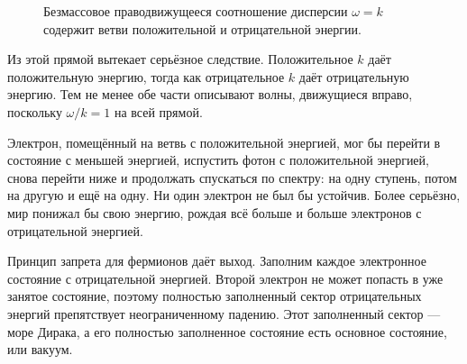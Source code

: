 \begin{figure}[htbp]
\centering
{}
\caption{Безмассовое праводвижущееся соотношение дисперсии \(\omega=k\) содержит ветви положительной и отрицательной энергии.}
\end{figure}

Из этой прямой вытекает серьёзное следствие. Положительное \(k\) даёт положительную энергию, тогда как отрицательное \(k\) даёт отрицательную энергию. Тем не менее обе части описывают волны, движущиеся вправо, поскольку \(\omega/k=1\) на всей прямой.

Электрон, помещённый на ветвь с положительной энергией, мог бы перейти в состояние с меньшей энергией, испустить фотон с положительной энергией, снова перейти ниже и продолжать спускаться по спектру: на одну ступень, потом на другую и ещё на одну. Ни один электрон не был бы устойчив. Более серьёзно, мир понижал бы свою энергию, рождая всё больше и больше электронов с отрицательной энергией.

Принцип запрета для фермионов даёт выход. Заполним каждое электронное состояние с отрицательной энергией. Второй электрон не может попасть в уже занятое состояние, поэтому полностью заполненный сектор отрицательных энергий препятствует неограниченному падению. Этот заполненный сектор — море Дирака, а его полностью заполненное состояние есть основное состояние, или вакуум.

\begin{classroomqa}
\end{classroomqa}

